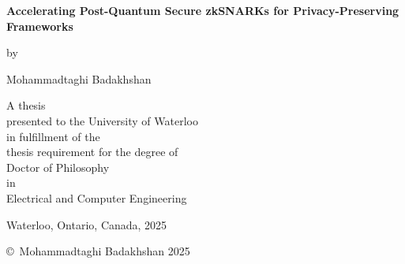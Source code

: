 \pagestyle{empty}

\begin{titlepage}
        \begin{center}
        \vspace*{1.0cm}

        \Huge
        {\bf Accelerating Post-Quantum Secure zkSNARKs for Privacy-Preserving Frameworks}


        \vspace*{1.0cm}

        \normalsize
        by \\

        \vspace*{1.0cm}

        \Large
        Mohammadtaghi Badakhshan \\

        \vspace*{2.5cm}

        \normalsize
        A thesis \\
        presented to the University of Waterloo \\ 
        in fulfillment of the \\
        thesis requirement for the degree of \\
        Doctor of Philosophy \\
        in \\
        Electrical and Computer Engineering \\

        \vspace*{2cm}

        Waterloo, Ontario, Canada, 2025 \\

        \vspace*{1.5cm}

        \copyright\ Mohammadtaghi Badakhshan 2025 \\
        \end{center}
\end{titlepage}

